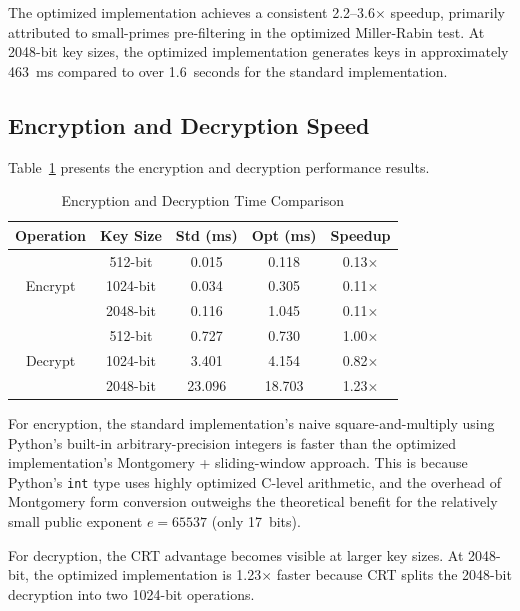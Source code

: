 \documentclass[conference]{IEEEtran}
\begin{document}
The optimized implementation achieves a consistent 2.2--3.6$\times$ speedup, primarily attributed to small-primes pre-filtering in the optimized Miller-Rabin test. At 2048-bit key sizes, the optimized implementation generates keys in approximately 463~ms compared to over 1.6~seconds for the standard implementation.

\subsection{Encryption and Decryption Speed}

Table~\ref{tab:encdec} presents the encryption and decryption performance results.

\begin{table}[htbp]
\caption{Encryption and Decryption Time Comparison}
\begin{center}
\begin{tabular}{|c|c|c|c|c|}
\hline
\textbf{Operation} & \textbf{Key Size} & \textbf{Std (ms)} & \textbf{Opt (ms)} & \textbf{Speedup} \\
\hline
\multirow{3}{*}{Encrypt} & 512-bit & 0.015 & 0.118 & 0.13$\times$ \\
\cline{2-5}
 & 1024-bit & 0.034 & 0.305 & 0.11$\times$ \\
\cline{2-5}
 & 2048-bit & 0.116 & 1.045 & 0.11$\times$ \\
\hline
\multirow{3}{*}{Decrypt} & 512-bit & 0.727 & 0.730 & 1.00$\times$ \\
\cline{2-5}
 & 1024-bit & 3.401 & 4.154 & 0.82$\times$ \\
\cline{2-5}
 & 2048-bit & 23.096 & 18.703 & 1.23$\times$ \\
\hline
\end{tabular}
\label{tab:encdec}
\end{center}
\end{table}

For encryption, the standard implementation's naive square-and-multiply using Python's built-in arbitrary-precision integers is faster than the optimized implementation's Montgomery + sliding-window approach. This is because Python's \texttt{int} type uses highly optimized C-level arithmetic, and the overhead of Montgomery form conversion outweighs the theoretical benefit for the relatively small public exponent $e = 65537$ (only 17~bits).

For decryption, the CRT advantage becomes visible at larger key sizes. At 2048-bit, the optimized implementation is 1.23$\times$ faster because CRT splits the 2048-bit decryption into two 1024-bit operations.
\end{document}
